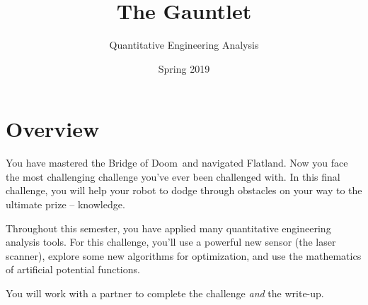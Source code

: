 \documentclass{tufte-handout}
\title{The Gauntlet}
\author{Quantitative Engineering Analysis}
\date{Spring 2019}
\begin{document}
\maketitle
\thispagestyle{firstpage}

\section{Overview}
You have mastered the Bridge of Doom\texttrademark~and navigated Flatland\texttrademark.  Now you face the most challenging challenge you've ever been challenged with.  In this final challenge, you will help your robot to dodge through obstacles on your way to the ultimate prize -- knowledge.

Throughout this semester, you have applied many quantitative engineering analysis tools. For this challenge, you'll use a powerful new sensor (the laser scanner), explore some new algorithms for optimization, and use the mathematics of artificial potential functions.

You will work with a partner to complete the challenge \emph{and} the write-up.
\end{document}
